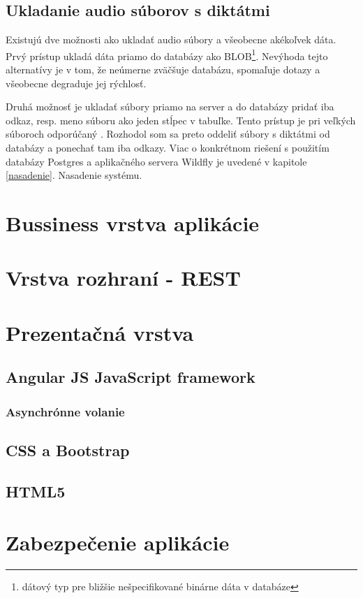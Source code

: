 \documentclass[12pt,oneside]{fithesis2}
\begin{document}
      \subsection{Ukladanie audio súborov s diktátmi} \label{ukladanie}
      \par Existujú dve možnosti ako ukladať audio súbory a všeobecne akékoľvek dáta. Prvý prístup ukladá dáta priamo do databázy ako BLOB\footnote{dátový typ pre bližšie nešpecifikované binárne dáta v databáze}. Nevýhoda tejto alternatívy je v tom, že neúmerne zväčšuje databázu, spomaľuje dotazy a všeobecne degraduje jej rýchlosť.
      \par Druhá možnosť je ukladať súbory priamo na server a do databázy pridať iba odkaz, resp. meno súboru ako jeden stĺpec v tabuľke. Tento prístup je pri veľkých súboroch odporúčaný \cite{sof1}. Rozhodol som sa preto oddeliť súbory s diktátmi od databázy a ponechať tam iba odkazy. Viac o konkrétnom riešení s použitím databázy Postgres a aplikačného servera Wildfly je uvedené v kapitole \ref{nasadenie}. Nasadenie systému.
      \section{Bussiness vrstva aplikácie}
      \section{Vrstva rozhraní - REST}
      \section{Prezentačná vrstva}
      		\subsection{Angular JS JavaScript framework}
			\subsubsection{Asynchrónne volanie }
      		\subsection{CSS a Bootstrap}
      		\subsection{HTML5}
      		\pagebreak
      \section{Zabezpečenie aplikácie}
\end{document}
